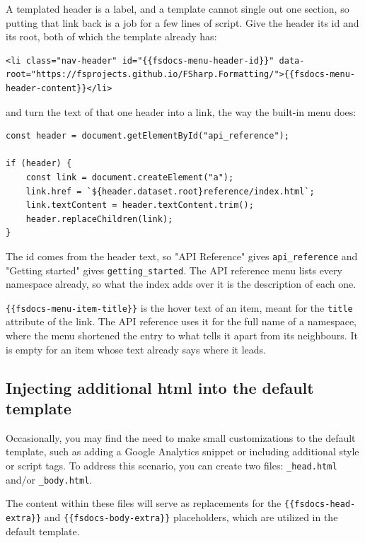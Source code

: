\documentclass{article}
\begin{document}
A templated header is a label, and a template cannot single out one section, so putting that link back is a job for
a few lines of script. Give the header its id and its root, both of which the template already has:
\begin{lstlisting}
<li class="nav-header" id="{{fsdocs-menu-header-id}}" data-root="https://fsprojects.github.io/FSharp.Formatting/">{{fsdocs-menu-header-content}}</li>

\end{lstlisting}


and turn the text of that one header into a link, the way the built-in menu does:
\begin{lstlisting}
const header = document.getElementById("api_reference");

if (header) {
    const link = document.createElement("a");
    link.href = `${header.dataset.root}reference/index.html`;
    link.textContent = header.textContent.trim();
    header.replaceChildren(link);
}

\end{lstlisting}


The id comes from the header text, so "API Reference" gives \texttt{api\_reference} and "Getting started" gives
\texttt{getting\_started}.
The API reference menu lists every namespace already, so what the index adds over it is the description of each one.


\texttt{\{\{fsdocs-menu-item-title\}\}} is the hover text of an item, meant for the \texttt{title} attribute of the link. The API
reference uses it for the full name of a namespace, where the menu shortened the entry to what tells it apart from
its neighbours. It is empty for an item whose text already says where it leads.
\subsection*{Injecting additional html into the default template}



Occasionally, you may find the need to make small customizations to the default template, such as adding a Google
Analytics snippet or including additional style or script tags. To address this scenario, you can create two
files: \texttt{\_head.html} and/or \texttt{\_body.html}.


The content within these files will serve as replacements for the \texttt{\{\{fsdocs-head-extra\}\}} and \texttt{\{\{fsdocs-body-extra\}\}}
placeholders, which are utilized in the default template.
\end{document}
